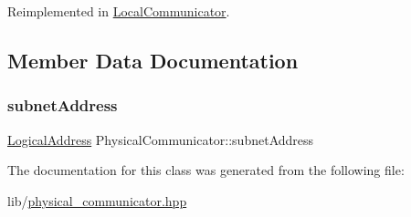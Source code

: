 Reimplemented in \hyperlink{classLocalCommunicator_afb8fc8a82069dac7bf08f736fa76c4c8}{Local\+Communicator}.



\subsection{Member Data Documentation}
\mbox{\label{classPhysicalCommunicator_a2ed89508db3fe68218192a6f3bacab26}} 
\subsubsection{\texorpdfstring{subnet\+Address}{subnetAddress}}
{\footnotesize\ttfamily \hyperlink{structLogicalAddress}{Logical\+Address} Physical\+Communicator\+::subnet\+Address}



The documentation for this class was generated from the following file\+:\begin{DoxyCompactItemize}
\item 
lib/\hyperlink{physical__communicator_8hpp}{physical\+\_\+communicator.\+hpp}\end{DoxyCompactItemize}
